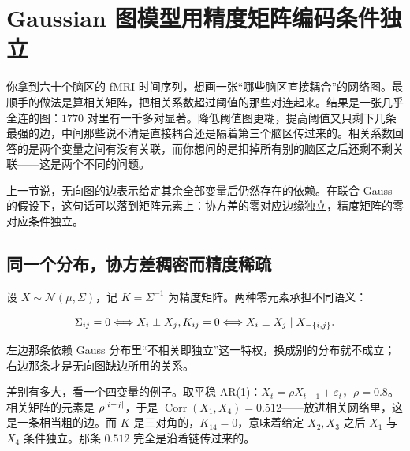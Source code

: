 \section{Gaussian 图模型用精度矩阵编码条件独立}
\label{sec:13-Machine-Learning/07-Graphical-and-Sequential-Models/02}

你拿到六十个脑区的 fMRI 时间序列，想画一张``哪些脑区直接耦合''的网络图。最顺手的做法是算相关矩阵，把相关系数超过阈值的那些对连起来。结果是一张几乎全连的图：\(1770\) 对里有一千多对显著。降低阈值图更糊，提高阈值又只剩下几条最强的边，中间那些说不清是直接耦合还是隔着第三个脑区传过来的。相关系数回答的是两个变量之间有没有关联，而你想问的是扣掉所有别的脑区之后还剩不剩关联——这是两个不同的问题。

上一节说，无向图的边表示给定其余全部变量后仍然存在的依赖。在联合 Gauss 的假设下，这句话可以落到矩阵元素上：协方差的零对应边缘独立，精度矩阵的零对应条件独立。

\subsection{同一个分布，协方差稠密而精度稀疏}

设 \(X\sim\mathcal N(\mu,\Sigma)\)，记 \(K=\Sigma^{-1}\) 为精度矩阵。两种零元素承担不同语义：

\[
\Sigma_{ij}=0
\space\Longleftrightarrow\space
X_i\perp X_j,
\space
K_{ij}=0
\space\Longleftrightarrow\space
X_i\perp X_j\mid X_{-\left\{i,j\right\}}.
\]

左边那条依赖 Gauss 分布里``不相关即独立''这一特权，换成别的分布就不成立；右边那条才是无向图缺边所用的关系。

差别有多大，看一个四变量的例子。取平稳 AR(1)：\(X_t=\rho X_{t-1}+\varepsilon_t\)，\(\rho=0.8\)。相关矩阵的元素是 \(\rho^{\left|i-j\right|}\)，于是 \(\operatorname{Corr}(X_1,X_4)=0.512\)——放进相关网络里，这是一条相当粗的边。而 \(K\) 是三对角的，\(K_{14}=0\)，意味着给定 \(X_2,X_3\) 之后 \(X_1\) 与 \(X_4\) 条件独立。那条 \(0.512\) 完全是沿着链传过来的。

